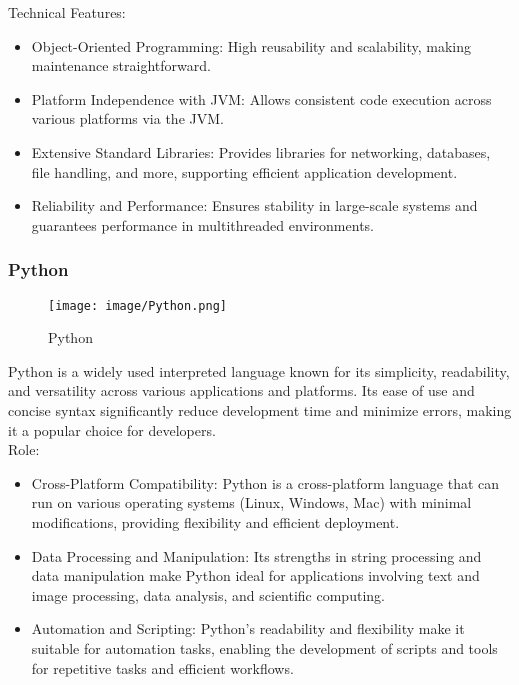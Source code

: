 \documentclass[conference]{IEEEtran}
\begin{document}
Technical Features:
\begin{itemize}
    \item Object-Oriented Programming: High reusability and scalability, making maintenance straightforward.\\
    \item Platform Independence with JVM: Allows consistent code execution across various platforms via the JVM.\\
    \item Extensive Standard Libraries: Provides libraries for networking, databases, file handling, and more, supporting efficient application development.\\
    \item Reliability and Performance: Ensures stability in large-scale systems and guarantees performance in multithreaded environments.\\
\end{itemize}



\subsubsection{Python}

\begin{figure}[h!]
    \centering
    \texttt{[image: image/Python.png]}
    \caption{Python}
    \label{fig:enter-label}
\end{figure}


\noindent Python is a widely used interpreted language known for its simplicity, readability, and versatility across various applications and platforms. Its ease of use and concise syntax significantly reduce development time and minimize errors, making it a popular choice for developers.\\

Role:
\begin{itemize}
    \item Cross-Platform Compatibility: Python is a cross-platform language that can run on various operating systems (Linux, Windows, Mac) with minimal modifications, providing flexibility and efficient deployment.\\
    \item Data Processing and Manipulation: Its strengths in string processing and data manipulation make Python ideal for applications involving text and image processing, data analysis, and scientific computing.\\
    \item Automation and Scripting: Python's readability and flexibility make it suitable for automation tasks, enabling the development of scripts and tools for repetitive tasks and efficient workflows.\\
\end{itemize}
\end{document}
